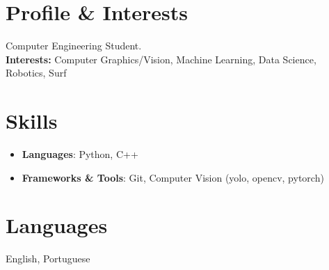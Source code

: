 \documentclass[a4paper,10pt]{article}
\begin{document}
\section*{Profile \& Interests}
\noindent Computer Engineering Student. \\ 
\textbf{Interests:} Computer Graphics/Vision, Machine Learning, Data Science, Robotics, Surf

\section*{Skills}
\begin{itemize}[leftmargin=*, noitemsep, topsep=0pt]
    \item \textbf{Languages}: Python, C++
    \item \textbf{Frameworks \& Tools}: Git, Computer Vision (yolo, opencv, pytorch)
\end{itemize}


\section*{Languages}
\noindent English, Portuguese
\end{document}
